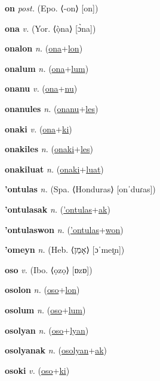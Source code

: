 \textbf{\hypertarget{on}{on}} \textit{post.} (Epo. ⟨-on⟩ [on])


\textbf{\hypertarget{ona}{ona}} \textit{v.} (Yor. ⟨ọ̀na⟩ [ɔ̀na])


\textbf{\hypertarget{onalon}{onalon}} \textit{n.} (\hyperlink{ona}{ona}+\allowbreak \hyperlink{lon}{lon})


\textbf{\hypertarget{onalum}{onalum}} \textit{n.} (\hyperlink{ona}{ona}+\allowbreak \hyperlink{lum}{lum})


\textbf{\hypertarget{onanu}{onanu}} \textit{v.} (\hyperlink{ona}{ona}+\allowbreak \hyperlink{nu}{nu})


\textbf{\hypertarget{onanules}{onanules}} \textit{n.} (\hyperlink{onanu}{onanu}+\allowbreak \hyperlink{les}{les})


\textbf{\hypertarget{onaki}{onaki}} \textit{v.} (\hyperlink{ona}{ona}+\allowbreak \hyperlink{ki}{ki})


\textbf{\hypertarget{onakiles}{onakiles}} \textit{n.} (\hyperlink{onaki}{onaki}+\allowbreak \hyperlink{les}{les})


\textbf{\hypertarget{onakiluat}{onakiluat}} \textit{n.} (\hyperlink{onaki}{onaki}+\allowbreak \hyperlink{luat}{luat})


\textbf{\hypertarget{'ontulas}{'ontulas}} \textit{n.} (Spa. ⟨Honduras⟩ [onˈduɾas])


\textbf{\hypertarget{'ontulasak}{'ontulasak}} \textit{n.} (\hyperlink{'ontulas}{'ontulas}+\allowbreak \hyperlink{ak}{ak})


\textbf{\hypertarget{'ontulaswon}{'ontulaswon}} \textit{n.} (\hyperlink{'ontulas}{'ontulas}+\allowbreak \hyperlink{won}{won})


\textbf{\hypertarget{'omeyn}{'omeyn}} \textit{n.} (Heb. ⟨{\hebrew{}אָמֵן}⟩ [ɔˈmeɪ̯n])


\textbf{\hypertarget{oso}{oso}} \textit{v.} (Ibo. ⟨ọzọ⟩ [ɒzɒ])


\textbf{\hypertarget{osolon}{osolon}} \textit{n.} (\hyperlink{oso}{oso}+\allowbreak \hyperlink{lon}{lon})


\textbf{\hypertarget{osolum}{osolum}} \textit{n.} (\hyperlink{oso}{oso}+\allowbreak \hyperlink{lum}{lum})


\textbf{\hypertarget{osolyan}{osolyan}} \textit{n.} (\hyperlink{oso}{oso}+\allowbreak \hyperlink{lyan}{lyan})


\textbf{\hypertarget{osolyanak}{osolyanak}} \textit{n.} (\hyperlink{osolyan}{osolyan}+\allowbreak \hyperlink{ak}{ak})


\textbf{\hypertarget{osoki}{osoki}} \textit{v.} (\hyperlink{oso}{oso}+\allowbreak \hyperlink{ki}{ki})


